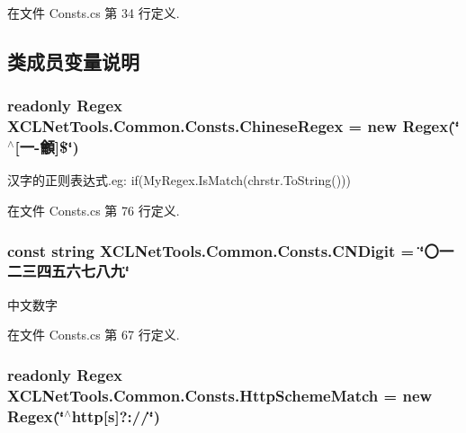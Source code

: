 在文件 Consts.\-cs 第 34 行定义.



\subsection{类成员变量说明}
\hypertarget{class_x_c_l_net_tools_1_1_common_1_1_consts_a55c7e91b6ab823a657306b4c1bb9d37a}{
\subsubsection[{Chinese\-Regex}]{\setlength{\rightskip}{0pt plus 5cm}readonly Regex X\-C\-L\-Net\-Tools.\-Common.\-Consts.\-Chinese\-Regex = new Regex(\char`\"{}$^\wedge$\mbox{[}一-\/龥\mbox{]}\$\char`\"{})\hspace{0.3cm}{\ttfamily [static]}}}\label{class_x_c_l_net_tools_1_1_common_1_1_consts_a55c7e91b6ab823a657306b4c1bb9d37a}


汉字的正则表达式.\-eg\-: if(My\-Regex.\-Is\-Match(chrstr.\-To\-String())) 



在文件 Consts.\-cs 第 76 行定义.

\hypertarget{class_x_c_l_net_tools_1_1_common_1_1_consts_afe7a5665a03a08e31c9cca0f7bc2b974}{
\subsubsection[{C\-N\-Digit}]{\setlength{\rightskip}{0pt plus 5cm}const string X\-C\-L\-Net\-Tools.\-Common.\-Consts.\-C\-N\-Digit = \char`\"{}〇一二三四五六七八九\char`\"{}}}\label{class_x_c_l_net_tools_1_1_common_1_1_consts_afe7a5665a03a08e31c9cca0f7bc2b974}


中文数字 



在文件 Consts.\-cs 第 67 行定义.

\hypertarget{class_x_c_l_net_tools_1_1_common_1_1_consts_a1458296b2ab205e2507639325a606806}{
\subsubsection[{Http\-Scheme\-Match}]{\setlength{\rightskip}{0pt plus 5cm}readonly Regex X\-C\-L\-Net\-Tools.\-Common.\-Consts.\-Http\-Scheme\-Match = new Regex(\char`\"{}$^\wedge$http\mbox{[}s\mbox{]}?\-://\char`\"{})\hspace{0.3cm}{\ttfamily [static]}}}\label{class_x_c_l_net_tools_1_1_common_1_1_consts_a1458296b2ab205e2507639325a606806}



